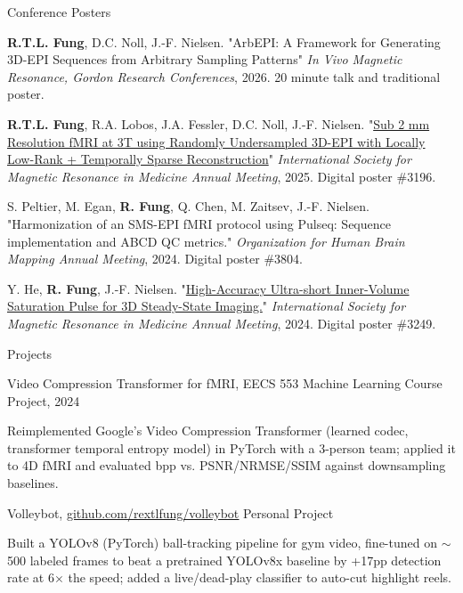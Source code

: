 \documentclass{resume}
\begin{document}
\begin{rSection}{Conference Posters}
\begin{rConference}
    \item \textbf{R.T.L. Fung}, D.C. Noll, J.-F. Nielsen.
    "ArbEPI: A Framework for Generating 3D-EPI Sequences from Arbitrary Sampling Patterns"
    \textit{In Vivo Magnetic Resonance, Gordon Research Conferences}, 2026. 20 minute talk and traditional poster.

    \item \textbf{R.T.L. Fung}, R.A. Lobos, J.A. Fessler, D.C. Noll, J.-F. Nielsen.
    "\href{https://archive.ismrm.org/2025/3196.html}{Sub 2 mm Resolution fMRI at 3T using Randomly Undersampled 3D-EPI with Locally Low-Rank + Temporally Sparse Reconstruction}"
    \textit{International Society for Magnetic Resonance in Medicine Annual Meeting}, 2025. Digital poster \#3196.

    \item S. Peltier, M. Egan, \textbf{R. Fung}, Q. Chen, M. Zaitsev, J.-F. Nielsen.
    "Harmonization of an SMS-EPI fMRI protocol using Pulseq: Sequence implementation and ABCD QC metrics."
    \textit{Organization for Human Brain Mapping Annual Meeting}, 2024. Digital poster \#3804.

    \item Y. He, \textbf{R. Fung}, J.-F. Nielsen.
    "\href{https://archive.ismrm.org/2024/3249.html}{High-Accuracy Ultra-short Inner-Volume Saturation Pulse for 3D Steady-State Imaging.}"
    \textit{International Society for Magnetic Resonance in Medicine Annual Meeting}, 2024. Digital poster \#3249.
\end{rConference}
\end{rSection}

\begin{rSection}{Projects}
    \begin{rSubsection}{Video Compression Transformer for fMRI}{, EECS 553 Machine Learning \hfill {Course Project, 2024}}
            \item Reimplemented Google's Video Compression Transformer (learned codec, transformer temporal entropy model) in PyTorch with a 3-person team; applied it to 4D fMRI and evaluated bpp vs. PSNR/NRMSE/SSIM against downsampling baselines.
	\end{rSubsection}
    \begin{rSubsection}{Volleybot}{, \href{https://github.com/rextlfung/volleybot}{\underline{github.com/rextlfung/volleybot}} \hfill {Personal Project}}
            \item Built a YOLOv8 (PyTorch) ball-tracking pipeline for gym video, fine-tuned on $\sim$500 labeled frames to beat a pretrained YOLOv8x baseline by +17pp detection rate at 6$\times$ the speed; added a live/dead-play classifier to auto-cut highlight reels.
	\end{rSubsection}
\end{rSection}
\end{document}
